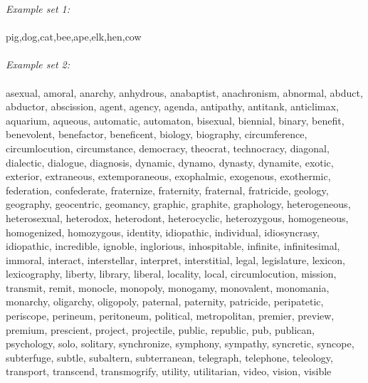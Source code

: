 \emph{Example set 1:}\\
\\
pig,dog,cat,bee,ape,elk,hen,cow\\
\\
\emph{Example set 2:}\\
\\
asexual, amoral, anarchy, anhydrous, anabaptist, anachronism, abnormal,
abduct, abductor, abscission, agent, agency, agenda, antipathy, 
antitank, anticlimax, aquarium, aqueous, automatic, automaton, 
bisexual, biennial, binary, benefit, benevolent, benefactor, 
beneficent, biology, biography, circumference, circumlocution, 
circumstance, democracy, theocrat, technocracy, diagonal, dialectic, 
dialogue, diagnosis, dynamic, dynamo, dynasty, dynamite, exotic, 
exterior, extraneous, extemporaneous, exophalmic, exogenous, exothermic, 
federation, confederate, fraternize, fraternity, fraternal, fratricide, 
geology, geography, geocentric, geomancy, graphic, graphite, 
graphology, heterogeneous, heterosexual, heterodox, heterodont, 
heterocyclic, heterozygous, homogeneous, homogenized, homozygous, 
identity, idiopathic, individual, idiosyncrasy, idiopathic, incredible, 
ignoble, inglorious, inhospitable, infinite, infinitesimal, immoral, 
interact, interstellar, interpret, interstitial, legal, legislature, 
lexicon, lexicography, liberty, library, liberal, locality, local, 
circumlocution, mission, transmit, remit, monocle, monopoly, monogamy, 
monovalent, monomania, monarchy, oligarchy, oligopoly, paternal, 
paternity, patricide, peripatetic, periscope, perineum, peritoneum, 
political, metropolitan, premier, preview, premium, prescient, project, 
projectile, public, republic, pub, publican, psychology, solo, 
solitary, synchronize, symphony, sympathy, syncretic, syncope, 
subterfuge, subtle, subaltern, subterranean, telegraph, telephone, 
teleology, transport, transcend, transmogrify, utility, utilitarian, 
video, vision, visible